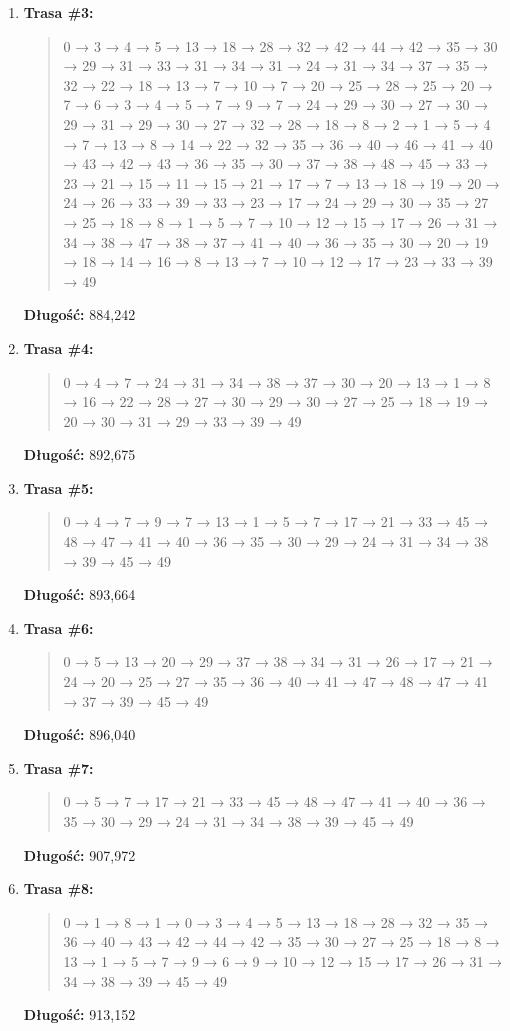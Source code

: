 \documentclass{article}
\begin{document}
\begin{enumerate}
    \item \textbf{Trasa \#3:}
    \begin{quote}
        0 → 3 → 4 → 5 → 13 → 18 → 28 → 32 → 42 → 44 → 42 → 35 → 30 → 29 → 31 → 33 → 31 → 34 → 31 → 24 → 31 → 34 → 37 → 35 → 32 → 22 → 18 → 13 → 7 → 10 → 7 → 20 → 25 → 28 → 25 → 20 → 7 → 6 → 3 → 4 → 5 → 7 → 9 → 7 → 24 → 29 → 30 → 27 → 30 → 29 → 31 → 29 → 30 → 27 → 32 → 28 → 18 → 8 → 2 → 1 → 5 → 4 → 7 → 13 → 8 → 14 → 22 → 32 → 35 → 36 → 40 → 46 → 41 → 40 → 43 → 42 → 43 → 36 → 35 → 30 → 37 → 38 → 48 → 45 → 33 → 23 → 21 → 15 → 11 → 15 → 21 → 17 → 7 → 13 → 18 → 19 → 20 → 24 → 26 → 33 → 39 → 33 → 23 → 17 → 24 → 29 → 30 → 35 → 27 → 25 → 18 → 8 → 1 → 5 → 7 → 10 → 12 → 15 → 17 → 26 → 31 → 34 → 38 → 47 → 38 → 37 → 41 → 40 → 36 → 35 → 30 → 20 → 19 → 18 → 14 → 16 → 8 → 13 → 7 → 10 → 12 → 17 → 23 → 33 → 39 → 49
    \end{quote}
    \textbf{Długość:} 884{,}242
    \item \textbf{Trasa \#4:}
    \begin{quote}
        0 → 4 → 7 → 24 → 31 → 34 → 38 → 37 → 30 → 20 → 13 → 1 → 8 → 16 → 22 → 28 → 27 → 30 → 29 → 30 → 27 → 25 → 18 → 19 → 20 → 30 → 31 → 29 → 33 → 39 → 49
    \end{quote}
    \textbf{Długość:} 892{,}675

    \item \textbf{Trasa \#5:}
    \begin{quote}
        0 → 4 → 7 → 9 → 7 → 13 → 1 → 5 → 7 → 17 → 21 → 33 → 45 → 48 → 47 → 41 → 40 → 36 → 35 → 30 → 29 → 24 → 31 → 34 → 38 → 39 → 45 → 49
    \end{quote}
    \textbf{Długość:} 893{,}664

    \item \textbf{Trasa \#6:}
    \begin{quote}
        0 → 5 → 13 → 20 → 29 → 37 → 38 → 34 → 31 → 26 → 17 → 21 → 24 → 20 → 25 → 27 → 35 → 36 → 40 → 41 → 47 → 48 → 47 → 41 → 37 → 39 → 45 → 49
    \end{quote}
    \textbf{Długość:} 896{,}040

    \item \textbf{Trasa \#7:}
    \begin{quote}
        0 → 5 → 7 → 17 → 21 → 33 → 45 → 48 → 47 → 41 → 40 → 36 → 35 → 30 → 29 → 24 → 31 → 34 → 38 → 39 → 45 → 49
    \end{quote}
    \textbf{Długość:} 907{,}972

    \item \textbf{Trasa \#8:}
    \begin{quote}
        0 → 1 → 8 → 1 → 0 → 3 → 4 → 5 → 13 → 18 → 28 → 32 → 35 → 36 → 40 → 43 → 42 → 44 → 42 → 35 → 30 → 27 → 25 → 18 → 8 → 13 → 1 → 5 → 7 → 9 → 6 → 9 → 10 → 12 → 15 → 17 → 26 → 31 → 34 → 38 → 39 → 45 → 49
    \end{quote}
    \textbf{Długość:} 913{,}152


\end{enumerate}
\end{document}
